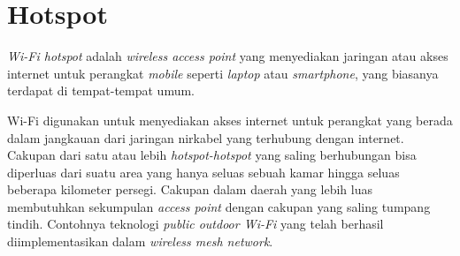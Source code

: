 %
%
%

\section{Hotspot}\label{sec:hotspot}



\textit{Wi-Fi hotspot} adalah \textit{wireless access point} yang menyediakan jaringan atau akses internet untuk perangkat \textit{mobile} seperti \textit{laptop} atau \textit{smartphone}, yang biasanya terdapat di tempat-tempat umum.  

Wi-Fi digunakan untuk menyediakan akses internet untuk perangkat yang berada dalam jangkauan dari jaringan nirkabel yang terhubung dengan internet. Cakupan dari satu atau lebih \textit{hotspot-hotspot} yang saling berhubungan bisa diperluas dari suatu area yang hanya seluas sebuah kamar hingga seluas beberapa kilometer persegi. Cakupan dalam daerah yang lebih luas membutuhkan sekumpulan \textit{access point} dengan cakupan yang saling tumpang tindih. Contohnya teknologi \textit{public outdoor Wi-Fi} yang telah berhasil diimplementasikan dalam \textit{wireless mesh network}.

